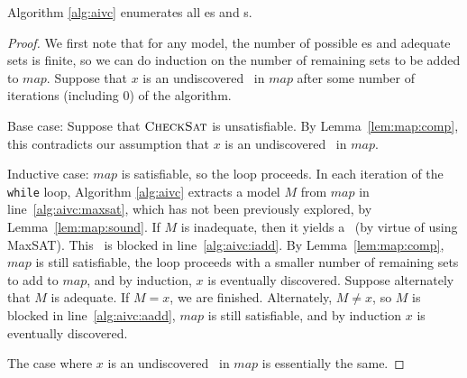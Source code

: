 \begin{theorem}
\label{theorem:aivc}
  Algorithm \ref{alg:aivc} enumerates all \mis es and \mivc s.
\end{theorem}
\begin{proof}
We first note that for any model, the number of possible \mis es and adequate sets is finite, so we can do induction on the number of remaining sets to be added to $map$.
Suppose that $x$ is an undiscovered \mivc\ in $map$ after some number of iterations (including 0) of the algorithm.

Base case: Suppose that $\textsc{CheckSat}$ is unsatisfiable.  By Lemma~\ref{lem:map:comp}, this contradicts our assumption that $x$ is an undiscovered \ivc\ in $map$.

Inductive case: $map$ is satisfiable, so the loop proceeds.  In each iteration of the \texttt{while} loop, Algorithm \ref{alg:aivc} extracts a model $M$ from $map$ in line~\ref{alg:aivc:maxsat}, which has not been previously explored, by Lemma~\ref{lem:map:sound}.  If $M$ is inadequate, then it yields a \mis\ (by virtue of using MaxSAT).  This \mis\ is blocked in line~\ref{alg:aivc:iadd}.  By Lemma~\ref{lem:map:comp}, $map$ is still satisfiable, the loop proceeds with a smaller number of remaining sets to add to $map$, and by induction, $x$ is eventually discovered.  Suppose alternately that $M$ is adequate.  If $M = x$, we are finished.  Alternately, $M \neq x$, so $M$ is blocked in line~\ref{alg:aivc:aadd}, $map$ is still satisfiable, and by induction $x$ is eventually discovered.

The case where $x$ is an undiscovered \mis\ in $map$ is essentially the same.

%


%
%
%
\end{proof}


